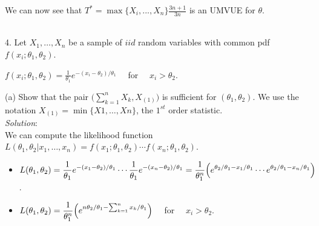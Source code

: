 \documentclass[12pt]{article}
\newcommand{\XB}{\color{black}}
\newcommand{\XBB}{\color{blue}}
\newcommand{\ds}{\displaystyle}
\begin{document}
\noindent
We can now see that $ \ds T^{*} = \max\{X_{i},...,X_{n}\} \frac{3n+1}{3n} $ is an UMVUE for $ \theta $. \\

\vspace{2.5mm}

\newpage
\XBB\hrulefill\XB \\

4. Let $ X_{1},\dots,X_{n} $ be a sample of $ iid $ random variables with common pdf $ f(x_{i}; \theta_{1}, \theta_{2}) $. \\

\begin{center}
    $ \ds f(x_{i}; \theta_{1}, \theta_{2}) = \frac{1}{\theta_{1}}e^{-(x_{i} - \theta_{2}) / \theta_{1}} \quad $ for $ \quad  x_{i} > \theta_{2} $.
\end{center}

\XBB\hrulefill\XB
\vspace{5mm}

(a) Show that the pair $ \ds \bigl( \sum_{k=1}^{n} X_{k} , X_{(1)} \bigr) $ is sufficient for $ (\theta_{1}, \theta_{2}) $. We use the notation $ X_{(1)} = \min\{ X{1}, \dots, X{n} \} $, the $1^{st}$ order statistic.
\vspace{2.5mm} \\
\textit{Solution}:
\vspace{2.5mm} \\

\noindent
We can compute the likelihood function $ L(\theta_{1}, \theta_{2} | x_{1}, \dots, x_{n}) = f(x_{1}; \theta_{1}, \theta_{2}) \cdots f(x_{n}; \theta_{1}, \theta_{2}) $.

\begin{itemize}
    \item $ \ds L(\theta_{1}, \theta_{2}) = \frac{1}{\theta_{1}}e^{-(x_{1} - \theta_{2}) / \theta_{1}} \cdots \frac{1}{\theta_{1}}e^{-(x_{n} - \theta_{2}) / \theta_{1}} = \frac{1}{\theta_{1}^{n}} \Bigl( e^{\theta_{2} / \theta_{1} - x_{1} / \theta_{1}} \cdots  e^{\theta_{2} / \theta_{1} - x_{n} / \theta_{1}} \Bigr) $.
    \item $ \ds L(\theta_{1}, \theta_{2}) = \frac{1}{\theta_{1}^{n}} \Bigl( e^{n \theta_{2} / \theta_{1} - \sum_{k=1}^{n} x_{k} / \theta_{1}} \Bigr) \quad $ for $ \quad  x_{i} > \theta_{2} $.
\end{itemize}
\end{document}
